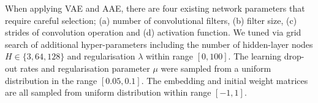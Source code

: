 When applying VAE and AAE, there are four existing  network parameters that require careful selection;
(a) number of convolutional filters, (b) filter size, (c) strides of convolution operation and (d) activation function. We tuned via grid search of additional hyper-parameters  including the number of hidden-layer nodes $H \in \{3, 64, 128\}$ and regularisation  $\lambda$ within range ${[0, 100]}$. The learning drop-out rates and regularisation parameter $\mu$ were sampled from a uniform distribution in the range $[0.05, 0.1]$. The embedding and initial weight matrices are all sampled from uniform distribution within range $[-1, 1]$.
